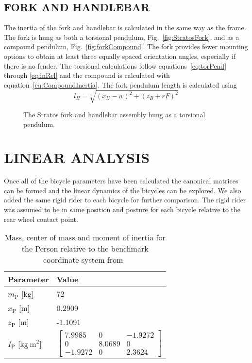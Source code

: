 \documentclass{bmd2010p}
\begin{document}
\subsection{FORK AND HANDLEBAR}
The inertia of the fork and handlebar is calculated in the same way as the frame. The fork is
hung as both a torsional pendulum, Fig.~\ref{fig:StratosFork}, and as a compound pendulum,
Fig.~\ref{fig:forkCompound}. The fork provides fewer mounting options to
obtain at least three equally spaced orientation angles, especially if there is
no fender. The torsional calculations follow equations~\ref{eq:torPend} through
\ref{eq:inRel} and the compound is calculated with
equation~\ref{eq:CompoundInertia}. The fork pendulum length is calculated using
\begin{equation}
    l_H=\sqrt{(x_H-w)^2+(z_B+rF)^2}
\end{equation}
\begin{figure}[tbp]
    \centering
    \caption{ The Stratos fork and handlebar assembly hung as a torsional
        pendulum.}
    \label{fig:torsional}
\end{figure}
\section{LINEAR ANALYSIS}
Once all of the bicycle parameters have been calculated the canonical matrices
can be formed and the linear dynamics of the bicycles can be explored. We also
added the same rigid rider to each bicycle for further comparison. The rigid
rider was assumed to be in same position and posture for each bicycle relative
to the rear wheel contact point.
\begin{table}[tbp]
    \centering
    \caption{Mass, center of mass and moment of inertia for the Person relative
    to the benchmark coordinate system from~\cite{Moore2009a}}
    \begin{tabular}{ll}
        Parameter & Value\\
        \hline
        $m_\mathrm{P}$ [kg] & 72\\
        $x_\mathrm{P}$ [m] & 0.2909\\
        $z_\mathrm{P}$ [m] & -1.1091\\
        $I_\mathrm{P}$ [$\mathrm{kg\ m}^2$] &
            $\left[
            \begin{array}{ccc}
                 7.9985 & 0      & -1.9272\\
                 0      & 8.0689 & 0\\
                -1.9272 & 0      & 2.3624
            \end{array}
            \right]$
    \end{tabular}
    \label{tab:riderParam}
\end{table}
\end{document}
